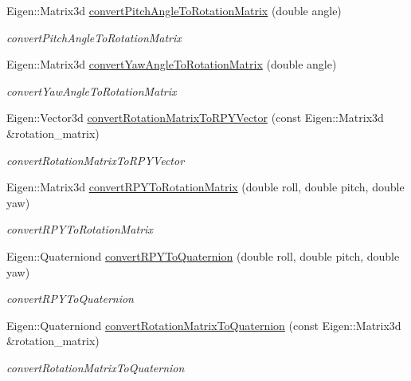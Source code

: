 \begin{DoxyCompactItemize}
Eigen\+::\+Matrix3d \hyperlink{namespacerobotis__manipulator_1_1math_aa6112f12db3755d6677f45c9e0806cbf}{convert\+Pitch\+Angle\+To\+Rotation\+Matrix} (double angle)
\begin{DoxyCompactList}\small\item\em convert\+Pitch\+Angle\+To\+Rotation\+Matrix \end{DoxyCompactList}\item 
Eigen\+::\+Matrix3d \hyperlink{namespacerobotis__manipulator_1_1math_a0a45b10176c2a214876aa265ec8e707e}{convert\+Yaw\+Angle\+To\+Rotation\+Matrix} (double angle)
\begin{DoxyCompactList}\small\item\em convert\+Yaw\+Angle\+To\+Rotation\+Matrix \end{DoxyCompactList}\item 
Eigen\+::\+Vector3d \hyperlink{namespacerobotis__manipulator_1_1math_adaa070908c6328c2459be5eaf64af68f}{convert\+Rotation\+Matrix\+To\+R\+P\+Y\+Vector} (const Eigen\+::\+Matrix3d \&rotation\+\_\+matrix)
\begin{DoxyCompactList}\small\item\em convert\+Rotation\+Matrix\+To\+R\+P\+Y\+Vector \end{DoxyCompactList}\item 
Eigen\+::\+Matrix3d \hyperlink{namespacerobotis__manipulator_1_1math_a4bbc795e8c06dd0472ed25864f6ec886}{convert\+R\+P\+Y\+To\+Rotation\+Matrix} (double roll, double pitch, double yaw)
\begin{DoxyCompactList}\small\item\em convert\+R\+P\+Y\+To\+Rotation\+Matrix \end{DoxyCompactList}\item 
Eigen\+::\+Quaterniond \hyperlink{namespacerobotis__manipulator_1_1math_aa1d5ec03193d986594c03ab884126416}{convert\+R\+P\+Y\+To\+Quaternion} (double roll, double pitch, double yaw)
\begin{DoxyCompactList}\small\item\em convert\+R\+P\+Y\+To\+Quaternion \end{DoxyCompactList}\item 
Eigen\+::\+Quaterniond \hyperlink{namespacerobotis__manipulator_1_1math_ae5a4fd98d1cef4a4b1224b19daff63bf}{convert\+Rotation\+Matrix\+To\+Quaternion} (const Eigen\+::\+Matrix3d \&rotation\+\_\+matrix)
\begin{DoxyCompactList}\small\item\em convert\+Rotation\+Matrix\+To\+Quaternion \end{DoxyCompactList}\item 

\end{DoxyCompactItemize}
